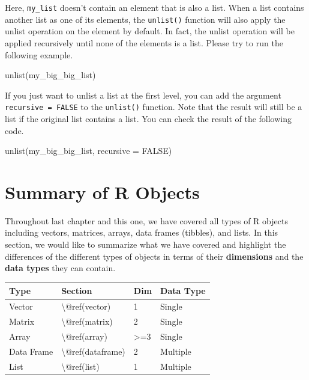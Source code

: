 \documentclass[
]{book}
\newenvironment{Shaded}{\begin{snugshade}}{\end{snugshade}}
\newcommand{\AttributeTok}[1]{\textcolor[rgb]{0.77,0.63,0.00}{#1}}
\newcommand{\ConstantTok}[1]{\textcolor[rgb]{0.00,0.00,0.00}{#1}}
\newcommand{\FunctionTok}[1]{\textcolor[rgb]{0.00,0.00,0.00}{#1}}
\newcommand{\NormalTok}[1]{#1}
\begin{document}
Here, \texttt{my\_list} doesn't contain an element that is also a list. When a list contains another list as one of its elements, the \texttt{unlist()} function will also apply the unlist operation on the element by default. In fact, the unlist operation will be applied recursively until none of the elements is a list. Please try to run the following example.

\begin{Shaded}
\begin{Highlighting}[]
\FunctionTok{unlist}\NormalTok{(my\_big\_big\_list)}
\end{Highlighting}
\end{Shaded}

If you just want to unlist a list at the first level, you can add the argument \texttt{recursive\ =\ FALSE} to the \texttt{unlist()} function. Note that the result will still be a list if the original list contains a list. You can check the result of the following code.

\begin{Shaded}
\begin{Highlighting}[]
\FunctionTok{unlist}\NormalTok{(my\_big\_big\_list, }\AttributeTok{recursive =} \ConstantTok{FALSE}\NormalTok{)}
\end{Highlighting}
\end{Shaded}

\hypertarget{summary-r-objects}{%
\section{Summary of R Objects}\label{summary-r-objects}}

Throughout last chapter and this one, we have covered all types of R objects including vectors, matrices, arrays, data frames (tibbles), and lists. In this section, we would like to summarize what we have covered and highlight the differences of the different types of objects in terms of their \textbf{dimensions} and the \textbf{data types} they can contain.

\begin{tabular}{l|l|l|l}
\hline
Type & Section & Dim & Data Type\\
\hline
Vector & \textbackslash{}@ref(vector) & 1 & Single\\
\hline
Matrix & \textbackslash{}@ref(matrix) & 2 & Single\\
\hline
Array & \textbackslash{}@ref(array) & >=3 & Single\\
\hline
Data Frame & \textbackslash{}@ref(dataframe) & 2 & Multiple\\
\hline
List & \textbackslash{}@ref(list) & 1 & Multiple\\
\hline
\end{tabular}
\end{document}
